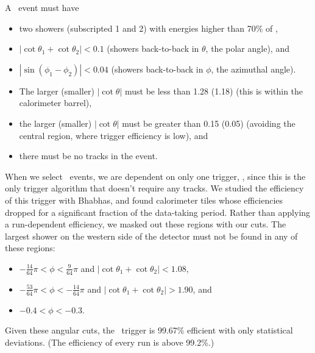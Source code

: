 \documentclass{cornell}
\begin{document}
A \gamgam\ event must have
\begin{itemize}

  \item two showers (subscripted 1 and 2) with energies higher than
    70\% of \ebeam,

  \item $|\cot\theta_1 + \cot\theta_2| < 0.1$ (showers back-to-back in
    $\theta$, the polar angle), and

  \item $|\sin(\phi_1 - \phi_2)| < 0.04$ (showers back-to-back in
    $\phi$, the azimuthal angle).

  \item The larger (smaller) $|\cot\theta|$ must be less than 1.28 (1.18)
    (this is within the calorimeter barrel),

  \item the larger (smaller) $|\cot\theta|$ must be greater than 0.15
  (0.05) (avoiding the central region, where trigger efficiency is
  low), and

  \item there must be no tracks in the event.

\end{itemize}
When we select \gamgam\ events, we are dependent on only one trigger,
\barrelbhabha, since this is the only trigger algorithm that doesn't
require any tracks.  We studied the efficiency of this trigger with
Bhabhas, and found calorimeter tiles whose efficiencies dropped for a
significant fraction of the data-taking period.  Rather than applying
a run-dependent efficiency, we masked out these regions with our cuts.
The largest shower on the western side of the detector must not be
found in any of these regions:
\begin{itemize}

  \item $-\frac{14}{64}\pi < \phi < \frac{9}{64}\pi$ and
    $|\cot\theta_1 + \cot\theta_2| < 1.08$,

  \item $-\frac{53}{64}\pi < \phi < -\frac{14}{64}\pi$ and
    $|\cot\theta_1 + \cot\theta_2| > 1.90$, and

  \item $-0.4 < \phi < -0.3$.

\end{itemize}
Given these angular cuts, the \barrelbhabha\ trigger is 99.67\%
efficient with only statistical deviations.  (The efficiency of every
run is above 99.2\%.)
\end{document}

